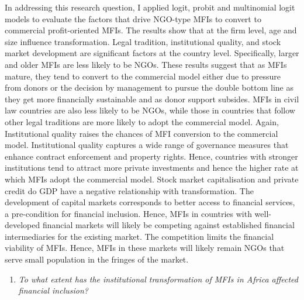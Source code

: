 \documentclass[a4paper, nobind]{templates/ociamthesis}
\providecommand{\tightlist}{%
  \setlength{\itemsep}{0pt}\setlength{\parskip}{0pt}}
\begin{document}
In addressing this research question, I applied logit, probit and multinomial logit models to evaluate the factors that drive NGO-type MFIs to convert to commercial profit-oriented MFIs. The results show that at the firm level, age and size influence transformation. Legal tradition, institutional quality, and stock market development are significant factors at the country level. Specifically, larger and older MFIs are less likely to be NGOs. These results suggest that as MFIs mature, they tend to convert to the commercial model either due to pressure from donors or the decision by management to pursue the double bottom line as they get more financially sustainable and as donor support subsides. MFIs in civil law countries are also less likely to be NGOs, while those in countries that follow other legal traditions are more likely to adopt the commercial model. Again, Institutional quality raises the chances of MFI conversion to the commercial model. Institutional quality captures a wide range of governance measures that enhance contract enforcement and property rights. Hence, countries with stronger institutions tend to attract more private investments and hence the higher rate at which MFIs adopt the commercial model. Stock market capitalisation and private credit do GDP have a negative relationship with transformation. The development of capital markets corresponds to better access to financial services, a pre-condition for financial inclusion. Hence, MFIs in countries with well-developed financial markets will likely be competing against established financial intermediaries for the existing market. The competition limits the financial viability of MFIs. Hence, MFIs in these markets will likely remain NGOs that serve small population in the fringes of the market.

\begin{enumerate}
\def\labelenumi{\arabic{enumi}.}
\setcounter{enumi}{1}
\tightlist
\item
  \emph{To what extent has the institutional transformation of MFIs in Africa affected financial inclusion?}
\end{enumerate}
\end{document}

